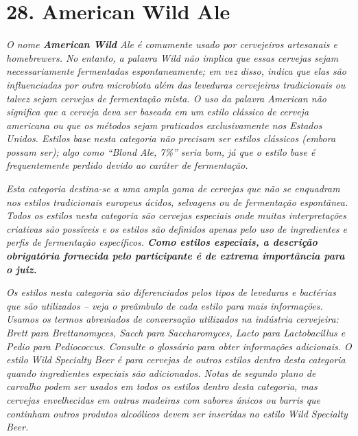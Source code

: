 \section*{28. American Wild Ale}
\textit{O nome \textbf{American Wild} Ale é comumente usado por cervejeiros artesanais e homebrewers. No entanto, a palavra Wild não implica que essas cervejas sejam necessariamente fermentadas espontaneamente; em vez disso, indica que elas são influenciadas por outra microbiota além das leveduras cervejeiras tradicionais ou talvez sejam cervejas de fermentação mista. O uso da palavra American não significa que a cerveja deva ser baseada em um estilo clássico de cerveja americana ou que os métodos sejam praticados exclusivamente nos Estados Unidos. Estilos base nesta categoria não precisam ser estilos clássicos (embora possam ser); algo como “Blond Ale, 7\%” seria bom, já que o estilo base é frequentemente perdido devido ao caráter de fermentação.}

\textit{Esta categoria destina-se a uma ampla gama de cervejas que não se enquadram nos estilos tradicionais europeus ácidos, selvagens ou de fermentação espontânea. Todos os estilos nesta categoria são cervejas especiais onde muitas interpretações criativas são possíveis e os estilos são definidos apenas pelo uso de ingredientes e perfis de fermentação específicos. \textbf{Como estilos especiais, a descrição obrigatória fornecida pelo participante é de extrema importância para o juiz.}}

\textit{Os estilos nesta categoria são diferenciados pelos tipos de leveduras e bactérias que são utilizados – veja o preâmbulo de cada estilo para mais informações. Usamos os termos abreviados de conversação utilizados na indústria cervejeira: Brett para Brettanomyces, Sacch para Saccharomyces, Lacto para Lactobacillus e Pedio para Pediococcus. Consulte o glossário para obter informações adicionais. O estilo Wild Specialty Beer é para cervejas de outros estilos dentro desta categoria quando ingredientes especiais são adicionados. Notas de segundo plano de carvalho podem ser usados em todos os estilos dentro desta categoria, mas cervejas envelhecidas em outras madeiras com sabores únicos ou barris que continham outros produtos alcoólicos devem ser inseridas no estilo Wild Specialty Beer.}
